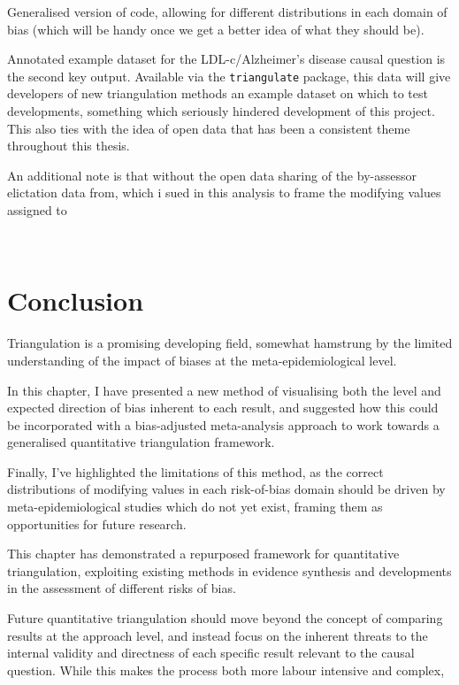 \documentclass[a4paper, twoside]{templates/ociamthesis}
\begin{document}
Generalised version of code, allowing for different distributions in each domain of bias (which will be handy once we get a better idea of what they should be).

Annotated example dataset for the LDL-c/Alzheimer's disease causal question is the second key output. Available via the \texttt{triangulate} package, this data will give developers of new triangulation methods an example dataset on which to test developments, something which seriously hindered development of this project. This also ties with the idea of open data that has been a consistent theme throughout this thesis.

An additional note is that without the open data sharing of the by-assessor elictation data from, which i sued in this analysis to frame the modifying values assigned to

~

\hypertarget{conclusion-1}{%
\section{Conclusion}\label{conclusion-1}}

Triangulation is a promising developing field, somewhat hamstrung by the limited understanding of the impact of biases at the meta-epidemiological level.

In this chapter, I have presented a new method of visualising both the level and expected direction of bias inherent to each result, and suggested how this could be incorporated with a bias-adjusted meta-analysis approach to work towards a generalised quantitative triangulation framework.

Finally, I've highlighted the limitations of this method, as the correct distributions of modifying values in each risk-of-bias domain should be driven by meta-epidemiological studies which do not yet exist, framing them as opportunities for future research.

This chapter has demonstrated a repurposed framework for quantitative triangulation, exploiting existing methods in evidence synthesis and developments in the assessment of different risks of bias.

Future quantitative triangulation should move beyond the concept of comparing results at the approach level, and instead focus on the inherent threats to the internal validity and directness of each specific result relevant to the causal question. While this makes the process both more labour intensive and complex,
\end{document}
